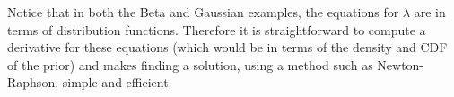 Notice that in both the Beta and Gaussian examples, the equations for $\lambda$ are in terms of distribution functions. Therefore it is straightforward to compute a derivative for these equations (which would be in terms of the density and CDF of the prior) and makes finding a solution, using a method such as Newton-Raphson, simple and efficient. 


